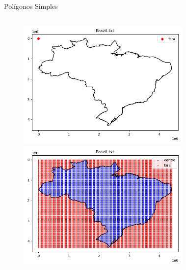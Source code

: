 \documentclass[aspectratio=169]{beamer}
\begin{document}
\begin{frame}{Polígonos Simples}
\begin{columns}
\begin{center}
      \begin{figure}
        \begin{overprint}
        \includegraphics[width=1.0\textwidth]{figures/Brazil.png}
        \includegraphics[width=1.0\textwidth]{figures/Brazil_grid.png}
        \end{overprint}
      \end{figure}
    \end{center}
    \begin{center}
      \begin{figure}
        \begin{overprint}

\end{overprint}
\end{figure}
\end{center}
\end{columns}
\end{frame}
\end{document}
